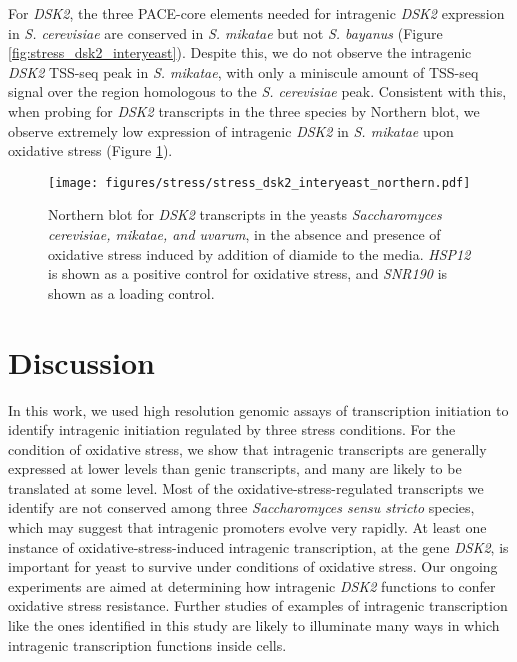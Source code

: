 For \textit{DSK2}, the three PACE-core elements needed for intragenic \textit{DSK2} expression in \textit{S. cerevisiae} are conserved in \textit{S. mikatae} but not \textit{S. bayanus} (Figure \ref{fig:stress_dsk2_interyeast}).
Despite this, we do not observe the intragenic \textit{DSK2} TSS-seq peak in \textit{S. mikatae}, with only a miniscule amount of TSS-seq signal over the region homologous to the \textit{S. cerevisiae} peak.
Consistent with this, when probing for \textit{DSK2} transcripts in the three species by Northern blot, we observe extremely low expression of intragenic \textit{DSK2} in \textit{S. mikatae} upon oxidative stress (Figure \ref{fig:stress_dsk2_interyeast_northern}).

\begin{figure}[h]
    \centering
    \texttt{[image: figures/stress/stress\_dsk2\_interyeast\_northern.pdf]}
    \caption[Northern blot for \textit{DSK2} transcripts in the yeasts \textit{Saccharomyces cerevisiae, mikatae, and uvarum}, in the absence and presence of oxidative stress.]{Northern blot for \textit{DSK2} transcripts in the yeasts \textit{Saccharomyces cerevisiae, mikatae, and uvarum}, in the absence and presence of oxidative stress induced by addition of diamide to the media. \textit{HSP12} is shown as a positive control for oxidative stress, and \textit{SNR190} is shown as a loading control.}
    \label{fig:stress_dsk2_interyeast_northern}
\end{figure}

\section{Discussion}

In this work, we used high resolution genomic assays of transcription initiation to identify intragenic initiation regulated by three stress conditions.
For the condition of oxidative stress, we show that intragenic transcripts are generally expressed at lower levels than genic transcripts, and many are likely to be translated at some level.
Most of the oxidative-stress-regulated transcripts we identify are not conserved among three \textit{Saccharomyces sensu stricto} species, which may suggest that intragenic promoters evolve very rapidly.
At least one instance of oxidative-stress-induced intragenic transcription, at the gene \textit{DSK2}, is important for yeast to survive under conditions of oxidative stress.
Our ongoing experiments are aimed at determining how intragenic \textit{DSK2} functions to confer oxidative stress resistance.
Further studies of examples of intragenic transcription like the ones identified in this study are likely to illuminate many ways in which intragenic transcription functions inside cells.


